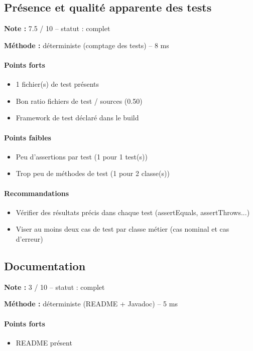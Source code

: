\documentclass[11pt,a4paper]{article}
\begin{document}
\subsection{Présence et qualité apparente des tests}
\noindent\textbf{Note :} 7.5 /\allowbreak{} 10 -- statut : complet

\noindent\textbf{Méthode :} déterministe (comptage des tests) -- 8 ms

\paragraph{Points forts}
\begin{itemize}
  \item 1 fichier(s) de test présents
  \item Bon ratio fichiers de test /\allowbreak{} sources (0.50)
  \item Framework de test déclaré dans le build
\end{itemize}
\paragraph{Points faibles}
\begin{itemize}
  \item Peu d'assertions par test (1 pour 1 test(s))
  \item Trop peu de méthodes de test (1 pour 2 classe(s))
\end{itemize}
\paragraph{Recommandations}
\begin{itemize}
  \item Vérifier des résultats précis dans chaque test (assertEquals, assertThrows...)
  \item Viser au moins deux cas de test par classe métier (cas nominal et cas d'erreur)
\end{itemize}
\subsection{Documentation}
\noindent\textbf{Note :} 3 /\allowbreak{} 10 -- statut : complet

\noindent\textbf{Méthode :} déterministe (README + Javadoc) -- 5 ms

\paragraph{Points forts}
\begin{itemize}
  \item README présent
\end{itemize}
\end{document}
